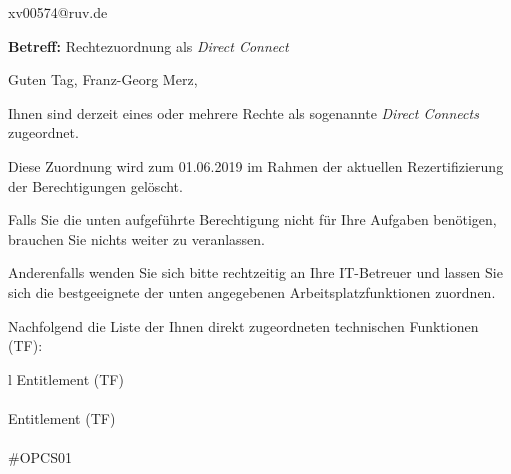 \documentclass[a4paper,landscape,12pt]{letter}
\begin{document}
\begin{letter}{xv00574@ruv.de\hfill \break}
\begin{normalsize}
	\opening{\textbf{Betreff:} Rechtezuordnung als \emph{Direct Connect}}
	\begin{normalsize} \hfill
	\end{normalsize}

	\begin{normalsize}
		Guten Tag, 
	Franz-Georg Merz, \hfill \break
	\end{normalsize}
	\end{normalsize}
	
\begin{normalsize}
	Ihnen sind derzeit eines oder mehrere Rechte als sogenannte \emph{Direct Connects} zugeordnet.
	
	Diese Zuordnung wird zum 01.06.2019 im Rahmen der aktuellen Rezertifizierung der Berechtigungen gelöscht.
	
	Falls Sie die unten aufgeführte Berechtigung nicht für Ihre Aufgaben benötigen, 
	brauchen Sie nichts weiter zu veranlassen.
	
	Anderenfalls wenden Sie sich bitte rechtzeitig an Ihre IT-Betreuer 
	und lassen Sie sich die bestgeeignete der unten angegebenen Arbeitsplatzfunktionen zuordnen.
	\end{normalsize}
	
\begin{normalsize}
	Nachfolgend die Liste der Ihnen direkt zugeordneten technischen Funktionen (TF):

	\begin{longtable}{l}
		Entitlement (TF) \\ \hline
		\endfirsthead
		\\\hline
		Entitlement (TF) \\ \hline
		\endhead %
		\multicolumn{1}{r@{}}{Fortsetzung \ldots}\\
		\endfoot
		\hline
		\endlastfoot
	\#OPCS01\\
	\end{longtable}
	\end{normalsize}
	

\end{letter}
\end{document}
